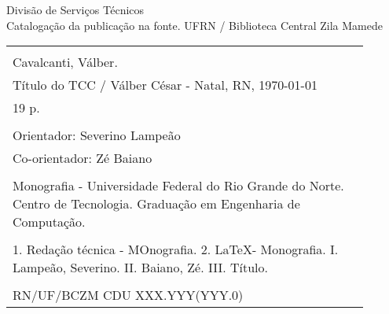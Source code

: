 %
%

\newpage

\begin{center}

\vspace*{\fill}

Divisão de Serviços Técnicos\\[1ex]
Catalogação da publicação na fonte.
UFRN / Biblioteca Central Zila Mamede

\vspace{2ex}

\begin{tabular}{|p{0.9\linewidth}|} \hline
\\
Cavalcanti, Válber.\\
\hspace{1em} Título do TCC /
Válber César - Natal, RN, \today \\
\hspace{1em} 19 p. \\
\\
\hspace{1em} Orientador: Severino Lampeão \\
\hspace{1em} Co-orientador: Zé Baiano \\
\\
\hspace{1em} Monografia - Universidade Federal do Rio Grande do Norte.
Centro de Tecnologia. Graduação em Engenharia de Computação. \\
\\
\hspace{1em} 1. Redação técnica - MOnografia. 2. \LaTeX - Monografia. 
I. Lampeão, Severino. II. Baiano, Zé.
III. Título. \\
\\
RN/UF/BCZM \hfill CDU XXX.YYY(YYY.0) \\ \hline
\end{tabular} 

\end{center}
